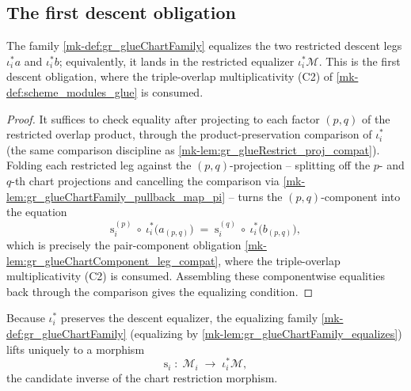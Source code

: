 \subsection{The first descent obligation}

\begin{lemma}\label{mk-lem:gr_glueChartFamily_equalizes}
  \leanok

  The family \ref{mk-def:gr_glueChartFamily} equalizes the two restricted descent legs
  \(\iota_i^{*}a\) and \(\iota_i^{*}b\); equivalently, it lands in the restricted
  equalizer \(\iota_i^{*}\mathcal{M}\). This is the first descent obligation, where the
  triple-overlap multiplicativity (C2) of \ref{mk-def:scheme_modules_glue} is consumed.
\end{lemma}
\begin{proof}
  \leanok
    It suffices to check equality after projecting to each factor \((p,q)\) of the
  restricted overlap product, through the product-preservation comparison of
  \(\iota_i^{*}\) (the same comparison discipline as \ref{mk-lem:gr_glueRestrict_proj_compat}).
  Folding each restricted leg against the \((p,q)\)-projection -- splitting off the
  \(p\)- and \(q\)-th chart projections and cancelling the comparison via
  \ref{mk-lem:gr_glueChartFamily_pullback_map_pi} -- turns the \((p,q)\)-component into the
  equation
  \[
    \mathrm{s}_i^{(p)}\ \circ\ \iota_i^{*}\bigl(a_{(p,q)}\bigr)
      \;=\;
    \mathrm{s}_i^{(q)}\ \circ\ \iota_i^{*}\bigl(b_{(p,q)}\bigr),
  \]
  which is precisely the pair-component obligation
  \ref{mk-lem:gr_glueChartComponent_leg_compat}, where the triple-overlap multiplicativity
  (C2) is consumed. Assembling these componentwise equalities back through the comparison
  gives the equalizing condition.
\end{proof}

\begin{definition}\label{mk-def:gr_glueRestrictionInv}
  \leanok

  Because \(\iota_i^{*}\) preserves the descent equalizer, the equalizing family
  \ref{mk-def:gr_glueChartFamily} (equalizing by \ref{mk-lem:gr_glueChartFamily_equalizes})
  lifts uniquely to a morphism
  \[
    \mathrm{s}_i \;:\; \mathcal{M}_i \;\longrightarrow\; \iota_i^{*}\mathcal{M},
  \]
  the candidate inverse of the chart restriction morphism.
\end{definition}

